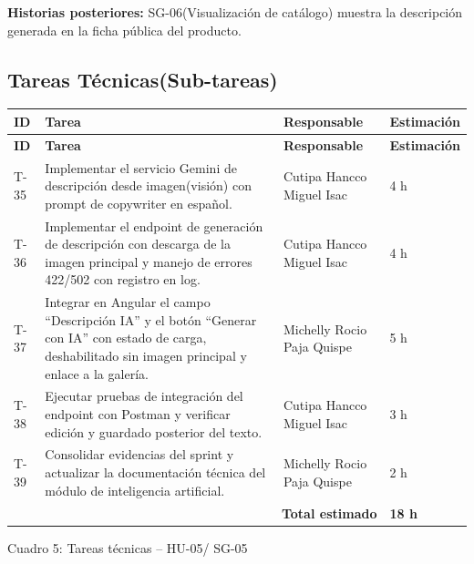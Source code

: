 \documentclass[12pt,a4paper]{article}
\begin{document}
\textbf{Historias posteriores:} SG-06(Visualización de catálogo) muestra la descripción generada en la ficha pública del producto.

\subsection*{Tareas Técnicas(Sub-tareas)}

{\small
\begin{longtable}{p{1.2cm} p{7.9cm} p{4.2cm} p{1.7cm}}
\toprule
\textbf{ID} & \textbf{Tarea} & \textbf{Responsable} & \textbf{Estimación} \\
\midrule
\endfirsthead

\toprule
\textbf{ID} & \textbf{Tarea} & \textbf{Responsable} & \textbf{Estimación} \\
\midrule
\endhead

\bottomrule
\endlastfoot

T-35 & Implementar el servicio Gemini de descripción desde imagen(visión) con prompt de copywriter en español. & Cutipa Hancco Miguel Isac & 4 h \\
T-36 & Implementar el endpoint de generación de descripción con descarga de la imagen principal y manejo de errores 422/502 con registro en log. & Cutipa Hancco Miguel Isac & 4 h \\
T-37 & Integrar en Angular el campo ``Descripción IA'' y el botón ``Generar con IA'' con estado de carga, deshabilitado sin imagen principal y enlace a la galería. & Michelly Rocio Paja Quispe & 5 h \\
T-38 & Ejecutar pruebas de integración del endpoint con Postman y verificar edición y guardado posterior del texto. & Cutipa Hancco Miguel Isac & 3 h \\
T-39 & Consolidar evidencias del sprint y actualizar la documentación técnica del módulo de inteligencia artificial. & Michelly Rocio Paja Quispe & 2 h \\

\midrule
\multicolumn{3}{r}{\textbf{Total estimado}} & \textbf{18 h} \\

\end{longtable}
}

\begin{center}
\small Cuadro 5: Tareas técnicas -- HU-05/ SG-05
\end{center}
\end{document}
